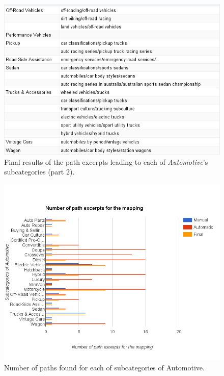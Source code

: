 \begin{figure}[h]
\centering
\includegraphics[width=\textwidth]{Chapters/Results/Final_classification_2}
\caption[Final results of mapping between path excerpts and IAB, part 2]{Final results of the path excerpts leading to each of \emph{Automotive}'s subcategories (part 2).}
\label{fig:finalclassification2}
\end{figure}

\begin{figure}[h]
\centering
\includegraphics[width=\textwidth]{Chapters/Results/Number_of_path_excerpts_automotive}
\caption{Number of paths found for each of subcategories of Automotive. }
\label{fig:number_of_path_excerpts_automotive}
\end{figure}

